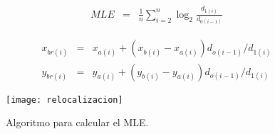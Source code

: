 \begin{eqnarray}\label{eq:Lyapunov}
MLE &=& \frac{1}{n} \sum_{i=2}^{n} \log_2{\frac{d_{1(i)}}{d_{0(i-1)}}}
\end{eqnarray}

\begin{eqnarray}\label{eq:reubicacion}
x_{br(i)}&=& x_{a(i)}+(x_{b(i)}-x_{a(i)})d_{o(i-1)}/d_{1(i)} \nonumber\\
y_{br(i)}&=& y_{a(i)}+(y_{b(i)}-y_{a(i)})d_{o(i-1)}/d_{1(i)}
\end{eqnarray}

\begin{figure}
	\centering
	\texttt{[image: relocalizacion]}\\
	\caption{Algoritmo para calcular el MLE.}\label{fig:relocalizacion}
\end{figure}
